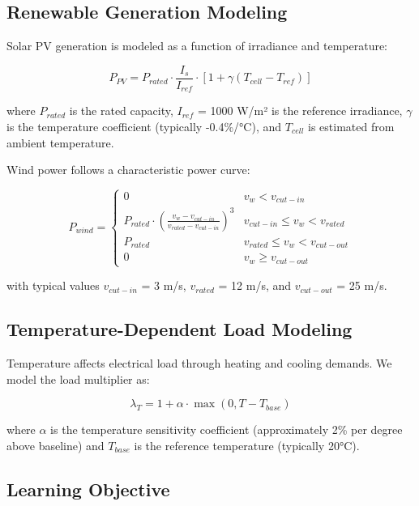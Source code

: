\documentclass[journal,12pt,onecolumn]{IEEEtran}
\begin{document}
\subsection{Renewable Generation Modeling}

Solar PV generation is modeled as a function of irradiance and temperature:

\begin{equation}
P_{PV} = P_{rated} \cdot \frac{I_s}{I_{ref}} \cdot [1 + \gamma(T_{cell} - T_{ref})]
\label{eq:pv_model}
\end{equation}

where $P_{rated}$ is the rated capacity, $I_{ref}$ = 1000 W/m² is the reference irradiance, $\gamma$ is the temperature coefficient (typically -0.4\%/°C), and $T_{cell}$ is estimated from ambient temperature.

Wind power follows a characteristic power curve:

\begin{equation}
P_{wind} = \begin{cases}
0 & v_w < v_{cut-in} \\
P_{rated} \cdot \left(\frac{v_w - v_{cut-in}}{v_{rated} - v_{cut-in}}\right)^3 & v_{cut-in} \leq v_w < v_{rated} \\
P_{rated} & v_{rated} \leq v_w < v_{cut-out} \\
0 & v_w \geq v_{cut-out}
\end{cases}
\label{eq:wind_model}
\end{equation}

with typical values $v_{cut-in}$ = 3 m/s, $v_{rated}$ = 12 m/s, and $v_{cut-out}$ = 25 m/s.

\subsection{Temperature-Dependent Load Modeling}

Temperature affects electrical load through heating and cooling demands. We model the load multiplier as:

\begin{equation}
\lambda_T = 1 + \alpha \cdot \max(0, T - T_{base})
\label{eq:load_temperature}
\end{equation}

where $\alpha$ is the temperature sensitivity coefficient (approximately 2\% per degree above baseline) and $T_{base}$ is the reference temperature (typically 20°C).

\subsection{Learning Objective}
\end{document}

